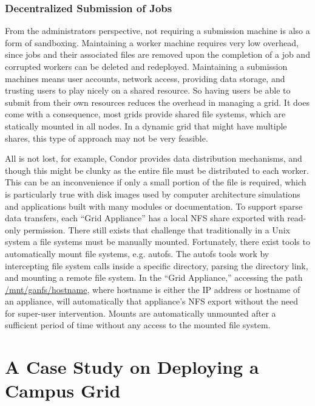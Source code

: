\documentclass[conference]{IEEEtran}
\begin{document}
\subsubsection{Decentralized Submission of Jobs}

From the administrators perspective, not requiring a submission machine is also
a form of sandboxing.  Maintaining a worker machine requires very low overhead,
since jobs and their associated files are removed upon the completion of a job
and corrupted workers can be deleted and redeployed.  Maintaining a submission
machines means user accounts, network access, providing data storage, and
trusting users to play nicely on a shared resource.  So having users be able to
submit from their own resources reduces the overhead in managing a grid.  It
does come with a consequence, most grids provide shared file systems, which are
statically mounted in all nodes.  In a dynamic grid that might have multiple
shares, this type of approach may not be very feasible.

All is not lost, for example, Condor provides data distribution mechanisms, and
though this might be clunky as the entire file must be distributed to each
worker.  This can be an inconvenience if only a small portion of the file is
required, which is particularly true with disk images used by computer
architecture simulations and applications built with many modules or
documentation.  To support sparse data transfers, each ``Grid Appliance'' has a
local NFS share exported with read-only permission.  There still exists that
challenge that traditionally in a Unix system a file systems must be manually
mounted.  Fortunately, there exist tools to automatically mount file systems,
e.g.  autofs. The autofs tools work by intercepting file system calls inside a
specific directory, parsing the directory link, and mounting a remote file
system.  In the ``Grid Appliance,'' accessing the path
\url{/mnt/ganfs/hostname}, where hostname is either the IP address or hostname
of an appliance, will automatically that appliance's NFS export without the
need for super-user intervention.  Mounts are automatically unmounted after a
sufficient period of time without any access to the mounted file system.  

\section{A Case Study on Deploying a Campus Grid}
\label{case_study}
\end{document}
